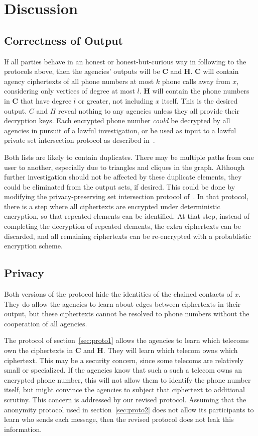 \section{Discussion}
\label{sec:discuss}

\subsection{Correctness of Output}

If all parties behave in an honest or honest-but-curious way in following to the protocols above, then the agencies' outputs will be $\mathbf{C}$ and $\mathbf{H}$. $\mathbf{C}$ will contain agency ciphertexts of all phone numbers at most $k$ phone calls away from $x$, considering only vertices of degree at most $l$. $\mathbf{H}$ will contain the phone numbers in $\mathbf{C}$ that have degree $l$ or greater, not including $x$ itself. This is the desired output. $C$ and $H$ reveal nothing to any agencies unless they all provide their decryption keys. Each encrypted phone number \emph{could} be decrypted by all agencies in pursuit of a lawful investigation, or be used as input to a lawful private set intersection protocol as described in~\cite{bandits}.

Both lists are likely to contain duplicates. There may be multiple paths from one user to another, especially due to triangles and cliques in the graph. Although further investigation should not be affected by these duplicate elements, they could be eliminated from the output sets, if desired. This could be done by modifying the privacy-preserving set intersection protocol of~\cite{bandits}. In that protocol, there is a step where all ciphertexts are encrypted under deterministic encryption, so that repeated elements can be identified. At that step, instead of completing the decryption of repeated elements, the extra ciphertexts can be discarded, and all remaining ciphertexts can be re-encrypted with a probablistic encryption scheme.

\subsection{Privacy}

Both versions of the protocol hide the identities of the chained contacts of $x$. They do allow the agencies to learn about edges between ciphertexts in their output, but these ciphertexts cannot be resolved to phone numbers without the cooperation of all agencies.

The protocol of section~\ref{sec:proto1} allows the agencies to learn which telecoms own the ciphertexts in $\mathbf{C}$ and $\mathbf{H}$. They will learn which telecom owns which ciphertext. This may be a security concern, since some telecoms are relatively small or specialized. If the agencies know that such a such a telecom owns an encrypted phone number, this will not allow them to identify the phone number itself, but might convince the agencies to subject that ciphertext to additional scrutiny. This concern is addressed by our revised protocol. Assuming that the anonymity protocol used in section~\ref{sec:proto2} does not allow its participants to learn who sends each message, then the revised protocol does not leak this information.

